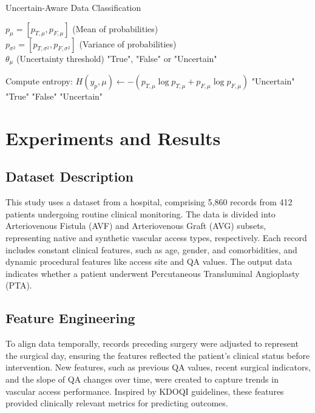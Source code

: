 \documentclass{ieeeaccess}
\begin{document}
\begin{algorithm}[H]
\caption{Uncertain-Aware Data Classification}
\label{alg: UncertainClassification}
\begin{algorithmic}[1]
\renewcommand{\algorithmicrequire}{\textbf{Input:}}
\renewcommand{\algorithmicensure}{\textbf{Output:}}
\REQUIRE $p_{\mu} = [p_{T,\mu}, p_{F,\mu}]$ (Mean of probabilities)\\
\hspace{1.2em} $p_{\sigma^2} = [p_{T,\sigma^2}, p_{F,\sigma^2}]$ (Variance of probabilities)\\
\hspace{1.2em} $\theta_{\mu}$ (Uncertainty threshold)
\ENSURE "True", "False" or "Uncertain"

\STATE Compute entropy: $H(y_p,\mu) \gets -(p_{T,\mu}\log p_{T,\mu} + p_{F,\mu}\log p_{F,\mu})$
    \RETURN "Uncertain"
\ELSE
        \RETURN "True"
        \RETURN "False"
    \ELSE
        \RETURN "Uncertain"
    \ENDIF
\ENDIF
\end{algorithmic}
\end{algorithm}

\section{Experiments and Results}
\subsection{Dataset Description}
This study uses a dataset from a hospital, comprising 5,860 records from 412 patients undergoing routine clinical monitoring. The data is divided into Arteriovenous Fistula (AVF) and Arteriovenous Graft (AVG) subsets, representing native and synthetic vascular access types, respectively. Each record includes constant clinical features, such as age, gender, and comorbidities, and dynamic procedural features like access site and QA values. The output data indicates whether a patient underwent Percutaneous Transluminal Angioplasty (PTA).

\subsection{Feature Engineering}
To align data temporally, records preceding surgery were adjusted to represent the surgical day, ensuring the features reflected the patient’s clinical status before intervention. New features, such as previous QA values, recent surgical indicators, and the slope of QA changes over time, were created to capture trends in vascular access performance. Inspired by KDOQI guidelines, these features provided clinically relevant metrics for predicting outcomes.
\end{document}
